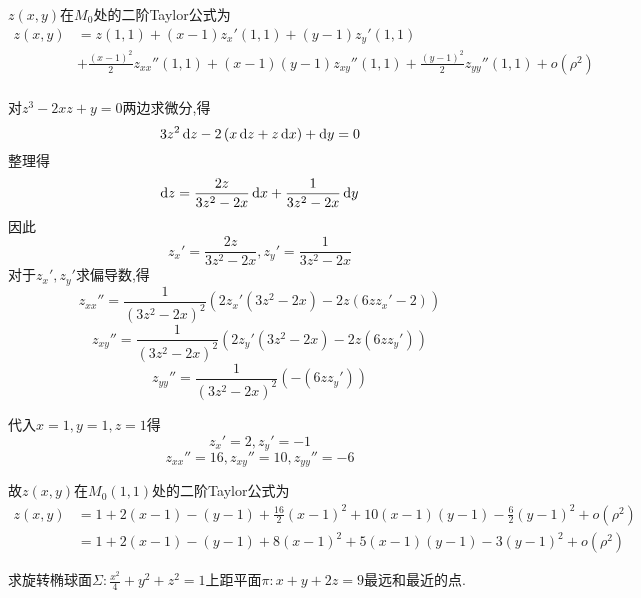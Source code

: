 \begin{solution}
    $z(x,y)$在$M_0$处的二阶Taylor公式为
    \begin{align*}
        z(x,y) &= z(1,1) + (x-1)z_x'(1,1) + (y-1)z_y'(1,1)\\
        &+ \frac{(x-1)^2}{2}z_{xx}''(1,1) + (x-1)(y-1)z_{xy}''(1,1) + \frac{(y-1)^2}{2}z_{yy}''(1,1) + o(\rho^2)\\
    \end{align*}

    对$z^3 -2xz + y = 0$两边求微分,得
    $$3z^2 \operatorname{d\!} z - 2 \left( x \operatorname{d\!} z + z \operatorname{d\!} x\right) + \operatorname{d\!} y = 0$$
    整理得
    $$\operatorname{d\!} z = \frac{2z}{3z^2 - 2x} \operatorname{d\!} x + \frac{1}{3z^2 - 2x} \operatorname{d\!} y$$
    因此
    $$z_x' = \frac{2z}{3z^2 - 2x}, z_y' = \frac{1}{3z^2 - 2x}$$
    对于$z_x',z_y'$求偏导数,得
    $$z_{xx}'' = \frac{1}{(3z^2 - 2x)^2} \left( 2z_x'(3z^2-2x) - 2z (6zz_x' - 2)\right)$$
    $$z_{xy}'' = \frac{1}{(3z^2 - 2x)^2} \left( 2z_y'(3z^2-2x) - 2z (6zz_y') \right)$$
    $$z_{yy}'' = \frac{1}{(3z^2 - 2x)^2} \left(-(6zz_y')\right)$$

    代入$x=1,y=1,z=1$得
    $$ z_x' = 2, z_y' = -1$$
    $$z_{xx}'' = 16, z_{xy}'' = 10, z_{yy}'' = -6$$

    故$z(x,y)$在$M_0(1,1)$处的二阶Taylor公式为
    \begin{align*}
        z(x,y) &= 1 + 2(x-1) - (y-1) + \frac{16}{2}(x-1)^2 + 10(x-1)(y-1) - \frac{6}{2}(y-1)^2 + o(\rho^2)\\
        &= 1 + 2(x-1) - (y-1) + 8(x-1)^2 + 5(x-1)(y-1) - 3(y-1)^2 + o(\rho^2)
    \end{align*}
\end{solution}

\begin{example}
    求旋转椭球面$\Sigma:\frac{x^2}{4} + y^2 + z^2 = 1$上距平面$\pi:x+y+2z = 9$最远和最近的点.
\end{example}

